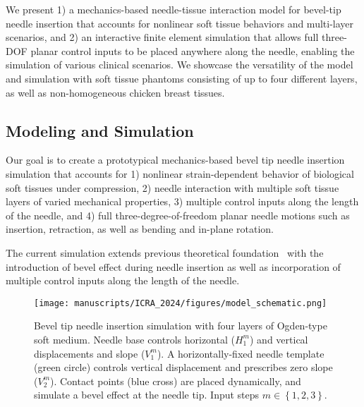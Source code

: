 We present 1) a mechanics-based needle-tissue interaction model for bevel-tip needle insertion that accounts for nonlinear soft tissue behaviors and multi-layer scenarios, and 2) an interactive finite element simulation that allows full three-DOF planar control inputs to be placed anywhere along the needle, enabling the simulation of various clinical scenarios. We showcase the versatility of the model and simulation with soft tissue phantoms consisting of up to four different layers, as well as non-homogeneous chicken breast tissues.

\subsection{Modeling and Simulation}
\label{sec:chap-4-modeling-and-simulation}

Our goal is to create a prototypical mechanics-based bevel tip needle insertion simulation that accounts for 1) nonlinear strain-dependent behavior of biological soft tissues under compression, 2) needle interaction with multiple soft tissue layers of varied mechanical properties, 3) multiple control inputs along the length of the needle, and 4) full three-degree-of-freedom planar needle motions such as insertion, retraction, as well as bending and in-plane rotation.

The current simulation extends previous theoretical foundation~\parencite{wangFlexibleNeedleBending2023} with the introduction of bevel effect during needle insertion as well as incorporation of multiple control inputs along the length of the needle.

\begin{figure}[ht]
  \centering
  \texttt{[image: manuscripts/ICRA\_2024/figures/model\_schematic.png]}
  \caption{Bevel tip needle insertion simulation with four layers of Ogden-type soft medium. Needle base controls horizontal ($H_1^m$) and vertical displacements and slope ($V_1^m$). A horizontally-fixed needle template (green circle) controls vertical displacement and prescribes zero slope ($V_2^m$). Contact points (blue cross) are placed dynamically, and simulate a bevel effect at the needle tip. Input steps $m\in \left\{ 1, 2, 3 \right\}$.}
  \label{fig:chap-4-model-schematic}
\end{figure}

